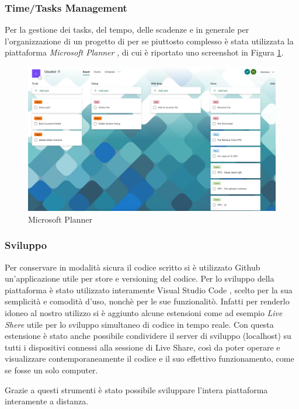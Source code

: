 \documentclass{article}
\begin{document}
\subsubsection{Time/Tasks Management}
Per la gestione dei tasks, del tempo, delle scadenze e in generale per l'organizzazione di un progetto di per se piuttosto complesso è stata utilizzata la piattaforma \textit{Microsoft Planner} \cite{microsoft_planner}, di cui è riportato uno screenshot in Figura \ref{fig:planner}.
\begin{figure}[!ht]
  \includegraphics[width=16cm]{images/planner.png}
  \centering
  \caption{Microsoft Planner}
  \label{fig:planner}
\end{figure}

\subsubsection{Sviluppo}
Per conservare in modalità sicura il codice scritto si è utilizzato Github un'applicazione utile per store e versioning del codice.
Per lo sviluppo della piattaforma è stato utilizzato interamente Visual Studio Code \cite{vs_code}, scelto per la sua semplicità e comodità d'uso, nonchè per le sue funzionalitò. Infatti per renderlo idoneo al nostro utilizzo si è aggiunto alcune estensioni come ad esempio \textit{Live Shere} utile per lo sviluppo simultaneo di codice in tempo reale. Con questa estensione è stato anche possibile condividere il server di sviluppo (localhost) su tutti i dispositivi connessi alla sessione di Live Share, così da poter operare e visualizzare contemporaneamente il codice e il suo effettivo funzionamento, come se fosse un solo computer.

Grazie a questi strumenti è stato possibile sviluppare l'intera piattaforma interamente a distanza.
\end{document}
